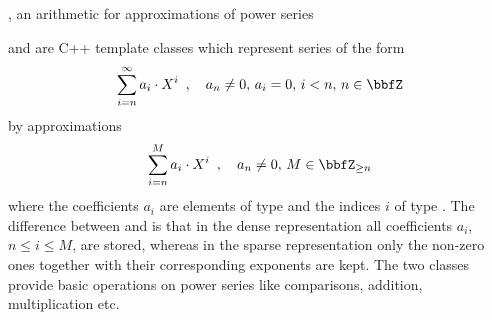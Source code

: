 

\NAME

,  \dotfill an arithmetic for
approximations of power series



\ABSTRACT

 and  are C++ template classes
which represent series of the form
\begin{displaymath}
  \sum_{i=n}^{\infty} a_{i} \cdot X^{i} \enspace,\quad a_{n} \neq 0,\, a_{i} = 0,\, i < n,\, n \in \bbfZ
\end{displaymath}
by approximations
\begin{displaymath}
  \sum_{i=n}^{M} a_{i} \cdot X^{i} \enspace,\quad a_{n}\neq 0,\, M \in \bbfZ_{\geq n}
\end{displaymath}
where the coefficients $a_{i}$ are elements of type  and the indices $i$ of type
.  The difference between  and
 is that in the dense representation all coefficients $a_{i}$, $n
\leq i \leq M$, are stored, whereas in the sparse representation only the non-zero ones together
with their corresponding exponents are kept.  The two classes provide basic operations on power
series like comparisons, addition, multiplication etc.



\DESCRIPTION

